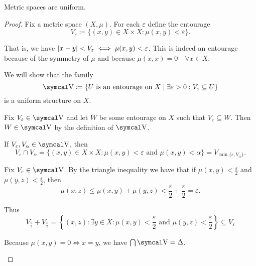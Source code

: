 \begin{proposition}\label{thm:metric_spaces_are_uniform}
  Metric spaces are uniform.
\end{proposition}
\begin{proof}
  Fix a metric space \( (X, \mu) \). For each \( \varepsilon \) define the entourage
  \begin{equation*}
    V_\varepsilon \coloneqq \{ (x, y) \in X \times X \colon \mu(x, y) < \varepsilon \}.
  \end{equation*}

  That is, we have \( \left\vert x - y \right\vert < V_\varepsilon \iff \mu(x, y) < \varepsilon \). This is indeed an entourage because of the symmetry of \( \mu \) and because \( \mu(x, x) = 0 \quad\forall x \in X \).

  We will show that the family
  \begin{equation*}
    \V \coloneqq \{ U \text{ is an entourage on } X \mid \exists \varepsilon > 0: V_\varepsilon \subseteq U \}
  \end{equation*}
  is a uniform structure on \( X \).

  \begin{description}
     Fix \( V_\varepsilon \in \V \) and let \( W \) be some entourage on \( X \) such that \( V_\varepsilon \subseteq W \). Then \( W \in \V \) by the definition of \( \V \).

     If \( V_\varepsilon, V_\alpha \in \V \), then
    \begin{equation*}
      V_\varepsilon \cap V_\alpha
      =
      \{ (x, y) \in X \times X \colon \mu(x, y) < \varepsilon \text{ and } \mu(x, y) < \alpha \}
      =
      V_{\min\{\varepsilon, V_\alpha \}}.
    \end{equation*}

     Fix \( V_\varepsilon \in \V \). By the triangle inequality we have that if \( \mu(x, y) < \frac \varepsilon 2 \) and \( \mu(y, z) < \frac \varepsilon 2 \), then
    \begin{equation*}
       \mu(x, z) \leq \mu(x, y) + \mu(y, z) < \frac \varepsilon 2 + \frac \varepsilon 2 = \varepsilon.
    \end{equation*}

    Thus
    \begin{equation*}
      V_{\frac \varepsilon 2} + V_{\frac \varepsilon 2}
      =
      \left\{ (x, z) \colon \exists y \in X: \mu(x, y) < \frac \varepsilon 2 \text{ and } \mu(y, z) < \frac \varepsilon 2 \right\}
      \subseteq
      V_\varepsilon
    \end{equation*}

     Because \( \mu(x, y) = 0 \iff x = y \), we have \( \bigcap \V = \Delta \).
  \end{description}
\end{proof}

